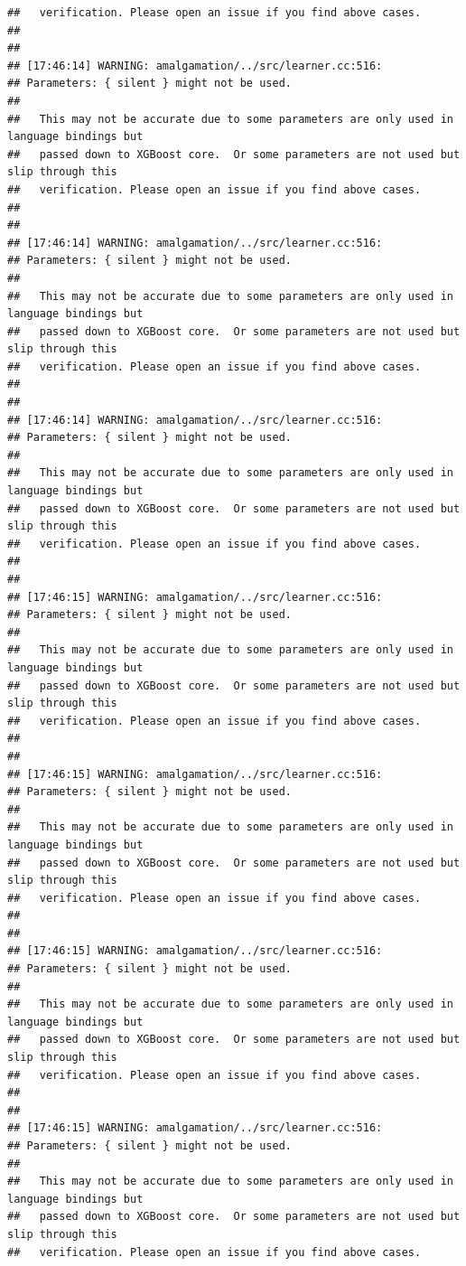 \documentclass[AMS,STIX2COL]{WileyNJD-v2}\usepackage[]{graphicx}\usepackage[]{color}
\makeatletter
\newenvironment{kframe}{%
 \def\at@end@of@kframe{}%
 \ifinner\ifhmode%
  \def\at@end@of@kframe{\end{minipage}}%
  \begin{minipage}{\columnwidth}%
 \fi\fi%
 \def\FrameCommand##1{\hskip\@totalleftmargin \hskip-\fboxsep
 \colorbox{shadecolor}{##1}\hskip-\fboxsep
     \hskip-\linewidth \hskip-\@totalleftmargin \hskip\columnwidth}%
 \MakeFramed {\advance\hsize-\width
   \@totalleftmargin\z@ \linewidth\hsize
   \@setminipage}}%
 {\par\unskip\endMakeFramed%
 \at@end@of@kframe}
\newenvironment{knitrout}{}{} %
\makeatother
\begin{document}
\begin{knitrout}
\begin{kframe}
\begin{verbatim}
##   verification. Please open an issue if you find above cases.
## 
## 
## [17:46:14] WARNING: amalgamation/../src/learner.cc:516: 
## Parameters: { silent } might not be used.
## 
##   This may not be accurate due to some parameters are only used in language bindings but
##   passed down to XGBoost core.  Or some parameters are not used but slip through this
##   verification. Please open an issue if you find above cases.
## 
## 
## [17:46:14] WARNING: amalgamation/../src/learner.cc:516: 
## Parameters: { silent } might not be used.
## 
##   This may not be accurate due to some parameters are only used in language bindings but
##   passed down to XGBoost core.  Or some parameters are not used but slip through this
##   verification. Please open an issue if you find above cases.
## 
## 
## [17:46:14] WARNING: amalgamation/../src/learner.cc:516: 
## Parameters: { silent } might not be used.
## 
##   This may not be accurate due to some parameters are only used in language bindings but
##   passed down to XGBoost core.  Or some parameters are not used but slip through this
##   verification. Please open an issue if you find above cases.
## 
## 
## [17:46:15] WARNING: amalgamation/../src/learner.cc:516: 
## Parameters: { silent } might not be used.
## 
##   This may not be accurate due to some parameters are only used in language bindings but
##   passed down to XGBoost core.  Or some parameters are not used but slip through this
##   verification. Please open an issue if you find above cases.
## 
## 
## [17:46:15] WARNING: amalgamation/../src/learner.cc:516: 
## Parameters: { silent } might not be used.
## 
##   This may not be accurate due to some parameters are only used in language bindings but
##   passed down to XGBoost core.  Or some parameters are not used but slip through this
##   verification. Please open an issue if you find above cases.
## 
## 
## [17:46:15] WARNING: amalgamation/../src/learner.cc:516: 
## Parameters: { silent } might not be used.
## 
##   This may not be accurate due to some parameters are only used in language bindings but
##   passed down to XGBoost core.  Or some parameters are not used but slip through this
##   verification. Please open an issue if you find above cases.
## 
## 
## [17:46:15] WARNING: amalgamation/../src/learner.cc:516: 
## Parameters: { silent } might not be used.
## 
##   This may not be accurate due to some parameters are only used in language bindings but
##   passed down to XGBoost core.  Or some parameters are not used but slip through this
##   verification. Please open an issue if you find above cases.

\end{verbatim}
\end{kframe}
\end{knitrout}
\end{document}
